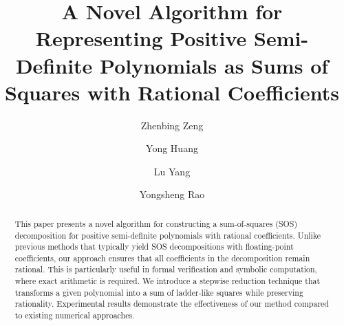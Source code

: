 \documentclass[runningheads]{llncs}
\begin{document}
%
\title{A Novel Algorithm for Representing Positive Semi-Definite Polynomials as Sums of Squares with Rational Coefficients}
%
%
\author{Zhenbing Zeng \and
Yong Huang \and
Lu Yang \and
Yongsheng Rao
}
%
%


%
\maketitle              %
%
\begin{abstract}
This paper presents a novel algorithm for constructing a sum-of-squares (SOS) decomposition for positive semi-definite polynomials with rational coefficients. Unlike previous methods that typically yield SOS decompositions with floating-point coefficients, our approach ensures that all coefficients in the decomposition remain rational. This is particularly useful in formal verification and symbolic computation, where exact arithmetic is required. We introduce a stepwise reduction technique that transforms a given polynomial into a sum of ladder-like squares while preserving rationality. Experimental results demonstrate the effectiveness of our method compared to existing numerical approaches.

\end{abstract}
%
%
%
\end{document}
